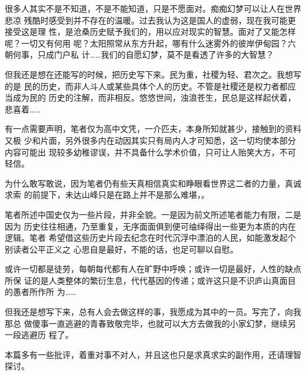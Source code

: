 很多人其实不是不知道，不是不能知道，只是不愿面对。痴痴幻梦可以让人在世界悲凉
残酷时感受到并不存在的温暖。过去我认为这是国人的虚弱，现在我可能更接受这是理
性，是沧桑历史赋予我们的，用以应对现实的智慧。面对了又能怎样呢？一切又有何用
呢？太阳照常从东方升起，哪有什么迷雾外的彼岸伊甸园？六朝何事，只成门户私
计……我们的自愿幻梦，莫不是看透了许多的大智慧？

但我还是想在还能写的时候，把历史写下来。民为重，社稷为轻、君次之。我想写的是
民的历史，而非人斗人或某些具体个人的历史。不管是社稷还是权力者都应当成为民的
历史的注解，而非相反。悠悠世间，浊浪苍生，民总是这样起伏着，悲喜着……

有一点需要声明，笔者仅为高中文凭，一介匹夫，本身所知就甚少，接触到的资料又极
少和片面，另外很多内在动因其实只有局内人才可知悉，这一切均使本部分内容可能出
现较多幼稚谬误，并不具备什么学术价值，只可让人贻笑大方，不可轻信。

为什么敢写敢说，因为笔者仍有些天真相信真实和睁眼看世界这二者的力量，真诚求索
的前提下，未达山峰只是在路上并不是那么难堪，。

笔者所述中国史仅为一些片段，并非全貌。一是因为前文所述笔者能力有限，二是因为
历史往往相通，乃至重复，无序面面俱到便可䌷绎得出一些更为本质的内在逻辑。笔者
希望借这些历史片段去纪念在时代沉浮中漂泊的人民，如能激发起个别读者公平正义之
心思自是最好，不能的话，也足可聊以自慰。

或许一切都是徒劳，每朝每代都有人在旷野中呼唤；或许一切是最好，人性的缺点所保
证的是人类整体的繁衍生息，代代基因的传递；或许这只是不识庐山真面目的愚者所作所
为……

但我还是想写下来，总有人会去做这样的事，我愿成为其中的一员。写完了，向我那总
做傻事一直逃避的青春致敬完毕，也就可以大方去做我的小家幻梦，继续另一段逃避历
程了。


本篇多有一些批评，着重对事不对人，并且这也只是求真求实的副作用，还请理智探讨。






